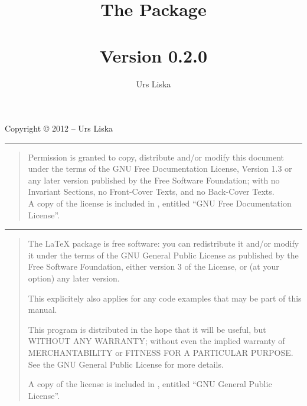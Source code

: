 \documentclass{article}
\begin{document}
\newcommand{\glyphlist}[3]{%
	\begin{figure}[htbp]
		\centering
		\texttt{[image: glyphlist/resources/\#3]}
		\caption{#1}
		\label{fig:#2}
	\end{figure}
}


\title{The \lilyglyphs[raise=0.1]Package\\~\\
	\normalsize Version 0.2.0}
\author{Urs Liska}

\maketitle

\pagebreak

\label{copyright}

\noindent Copyright \copyright{} 2012 -- Urs Liska

\medskip
\hrule

\begin{quote}
Permission is granted to copy, distribute and/or modify this document
under the terms of the GNU Free Documentation License, Version 1.3
or any later version published by the Free Software Foundation;
with no Invariant Sections, no Front-Cover Texts, and no Back-Cover Texts.\\
A copy of the license is included in , entitled \enquote{GNU Free Documentation License}.
\end{quote}

\hrule

\begin{quote}
The \lilyglyphs \LaTeX{} package is free software: you can redistribute it and/or modify  
it under the terms of the GNU General Public License as published by  
the Free Software Foundation, either version 3 of the License, or     
(at your option) any later version.         
  
This explicitely also applies for any code examples that may be part of this manual.
                                                                        
This program is distributed in the hope that it will be useful,       
but WITHOUT ANY WARRANTY; without even the implied warranty of        
MERCHANTABILITY or FITNESS FOR A PARTICULAR PURPOSE. See the          
GNU General Public License for more details.                          

A copy of the license is included in , entitled \enquote{GNU
General Public License}.

\end{quote}
\end{document}
